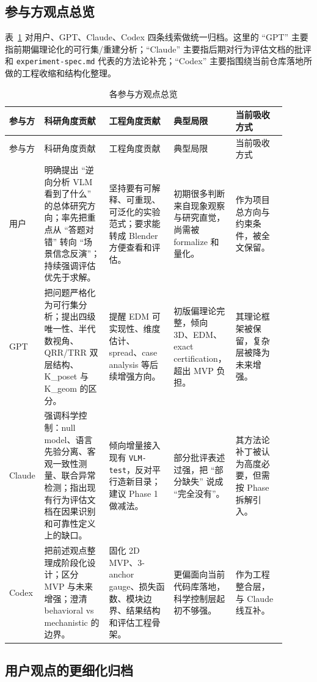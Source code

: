 \documentclass[11pt,a4paper]{ctexart}
\begin{document}
\subsection{参与方观点总览}

表~\ref{tab:participants-overview} 对用户、GPT、Claude、Codex 四条线索做统一归档。这里的 ``GPT'' 主要指前期偏理论化的可行集/重建分析；``Claude'' 主要指后期对行为评估文档的批评和 \texttt{experiment-spec.md} 代表的方法论补充；``Codex'' 主要指围绕当前仓库落地所做的工程收缩和结构化整理。

\begin{longtable}{p{0.11\linewidth}p{0.23\linewidth}p{0.23\linewidth}p{0.15\linewidth}p{0.18\linewidth}}
\caption{各参与方观点总览}\label{tab:participants-overview}\\
\toprule
参与方 & 科研角度贡献 & 工程角度贡献 & 典型局限 & 当前吸收方式 \\
\midrule
\endfirsthead
\toprule
参与方 & 科研角度贡献 & 工程角度贡献 & 典型局限 & 当前吸收方式 \\
\midrule
\endhead
用户 & 明确提出 ``逆向分析 VLM 看到了什么'' 的总体研究方向；率先把重点从 ``答题对错'' 转向 ``场景信念反演''；持续强调评估优先于求解。 & 坚持要有可解释、可重现、可泛化的实验范式；要求能转成 Blender 方便查看和评估。 & 初期很多判断来自现象观察与研究直觉，尚需被 formalize 和量化。 & 作为项目总方向与约束条件，被全文保留。 \\
GPT & 把问题严格化为可行集分析；提出四级唯一性、半代数视角、QRR/TRR 双层结构、K\_poset 与 K\_geom 的区分。 & 提醒 EDM 可实现性、维度估计、spread、case analysis 等后续增强方向。 & 初版偏理论完整，倾向 3D、EDM、exact certification，超出 MVP 负担。 & 其理论框架被保留，复杂层被降为未来增强。 \\
Claude & 强调科学控制：null model、语言先验分离、客观一致性测量、联合异常检测；指出现有行为评估文档在因果识别和可靠性定义上的缺口。 & 倾向增量接入现有 \texttt{VLM-test}，反对平行造新目录；建议 Phase 1 做减法。 & 部分批评表述过强，把 ``部分缺失'' 说成 ``完全没有''。 & 其方法论补丁被认为高度必要，但需按 Phase 拆解引入。 \\
Codex & 把前述观点整理成阶段化设计；区分 MVP 与未来增强；澄清 behavioral vs mechanistic 的边界。 & 固化 2D MVP、3-anchor gauge、损失函数、模块边界、结果结构和评估工程骨架。 & 更偏面向当前代码库落地，科学控制层起初不够强。 & 作为工程整合层，与 Claude 线互补。 \\
\bottomrule
\end{longtable}

\subsection{用户观点的更细化归档}
\end{document}
